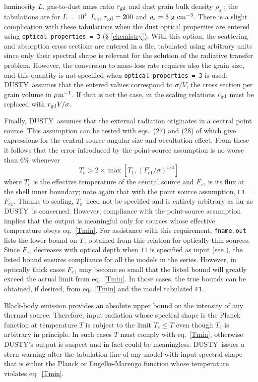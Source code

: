 \documentclass[11pt]{article}
\def\D    {{\sf DUSTY}}
\def\E#1{\hbox{$10^{#1}$}}
\def\eq#1{\begin{equation} #1 \end{equation}}
\def\mic    {\hbox{$\mu$m}}
\def\Lo     {\hbox{$L_{\odot}$}}
\def\Te   {\hbox{$T_e$}}
\begin{document}
luminosity $L$, gas-to-dust mass ratio $r_{\rm gd}$ and dust grain
bulk density $\rho_s$ \cite{EI01, IE10}; the tabulations are for $L$ =
\E4\ \Lo, $r_{\rm gd} = 200$ and $\rho_s = 3\ \rm g~cm^{-3}$. There is
a slight complication with these tabulations when the dust optical
properties are entered using {\tt optical properties = 3} (\S
\ref{chemistry}). With this option, the scattering and absorption
cross sections are entered in a file, tabulated using arbitrary units
since only their spectral shape is relevant for the solution of the
radiative transfer problem. However, the conversion to mass-loss rate
requires also the grain size, and this quantity is not specified when
{\tt optical properties = 3} is used.  \D\ assumes that the entered
values correspond to $\sigma/V$, the cross section per grain volume in
$\mic^{-1}$.  If that is not the case, in the scaling relations
$r_{\rm gd}$ must be replaced with $r_{\rm gd}V/\sigma$.

Finally, \D\ assumes that the external radiation originates in a
central point source. This assumption can be tested with eqs.\ (27)
and (28) of \cite{IE97} which give expressions for the central source
angular size and occultation effect. From these it follows that the
error introduced by the point-source assumption is no worse than 6\%
whenever \eq{\label{Tmin} T_e > 2\times\max[T_1,
  (F_{e1}/\sigma)^{1/4}]} where $T_e$ is the effective temperature of
the central source and $F_{e1}$ is its flux at the shell inner
boundary; note again that with the point source assumption, {\tt F1} =
$F_{e1}$. Thanks to scaling, \Te\ need not be specified and is
entirely arbitrary as far as \D\ is concerned. However, compliance
with the point-source assumption implies that the output is meaningful
only for sources whose effective temperature obeys eq.\
\ref{Tmin}. For assistance with this requirement, {\tt fname.out}
lists the lower bound on $T_e$ obtained from this relation for
optically thin sources. Since $F_{e1}$ decreases with optical depth
when {\tt T1} is specified as input (see \cite{IE97}), the listed
bound ensures compliance for all the models in the series. However, in
optically thick cases $F_{e1}$ may become so small that the listed
bound will greatly exceed the actual limit from eq.\ \ref{Tmin}. In
those cases, the true bounds can be obtained, if desired, from eq.\
\ref{Tmin} and the model tabulated {\tt F1}.

Black-body emission provides an absolute upper bound on the intensity
of any thermal source. Therefore, input radiation whose spectral shape
is the Planck function at temperature $T$ is subject to the limit $T_e
\le T$ even though $T_e$ is arbitrary in principle. In such cases $T$
must comply with eq.\ \ref{Tmin}, otherwise \D's output is suspect and
in fact could be meaningless.  \D\ issues a stern warning after the
tabulation line of any model with input spectral shape that is either
the Planck or Engelke-Marengo function whose temperature violates eq.\
\ref{Tmin}.
\end{document}
